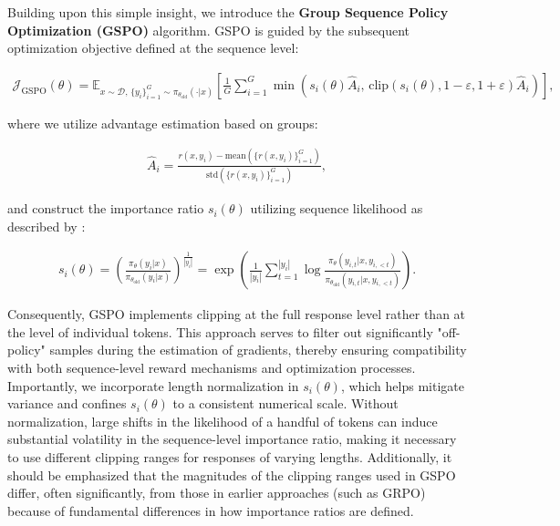 Building upon this simple insight, we introduce the \textbf{Group Sequence Policy Optimization (GSPO)} algorithm. GSPO is guided by the subsequent optimization objective defined at the sequence level:

\begin{align}
\mathcal{J}_\text{GSPO} (\theta) =
\mathbb{E}_{ x \sim \mathcal{D},\, \{y_i\}_{i=1}^G \sim \pi_{\theta_\text{old}}( \cdot | x) }
\left[ 
\frac{1}{G} \sum_{i=1}^{G}
\min \left( s_{i}(\theta)  \widehat{A}_{i},  \, \mathrm{clip} \left( s_{i}(\theta), 1 - {\varepsilon}, 1 + {\varepsilon} \right) \widehat{A}_{i} \right) 
\right],
\label{equ:gspo}
\end{align}

where we utilize advantage estimation based on groups:

\begin{align}
\widehat{A}_{i} = \frac{r(x, y_i) - \mathrm{mean} \left( \{ r(x, y_i) \}_{i=1}^G \right) }{ \mathrm{std} \left( \{ r(x, y_i) \}_{i=1}^G \right) },
\end{align}

and construct the importance ratio $s_{i}(\theta)$ utilizing sequence likelihood as described by \citep{click}:

\begin{align}
s_{i}(\theta) = \left( \frac{ \pi_{\theta} (y_i | x) }{ \pi_{\theta_\text{old}} (y_i | x)} \right)^{\frac{1}{|y_i|}}
=
\exp \left( \frac{1}{|y_i|} \sum_{t=1}^{|y_i|} \log \frac{ \pi_{\theta} (y_{i,t} | x, y_{i,<t}) }{ \pi_{\theta_\text{old}} (y_{i,t} | x,y_{i,<t})} \right).
\end{align}

Consequently, GSPO implements clipping at the full response level rather than at the level of individual tokens. This approach serves to filter out significantly "off-policy" samples during the estimation of gradients, thereby ensuring compatibility with both sequence-level reward mechanisms and optimization processes. Importantly, we incorporate length normalization in $s_{i}(\theta)$, which helps mitigate variance and confines $s_{i}(\theta)$ to a consistent numerical scale. Without normalization, large shifts in the likelihood of a handful of tokens can induce substantial volatility in the sequence-level importance ratio, making it necessary to use different clipping ranges for responses of varying lengths. Additionally, it should be emphasized that the magnitudes of the clipping ranges used in GSPO differ, often significantly, from those in earlier approaches (such as GRPO) because of fundamental differences in how importance ratios are defined.

